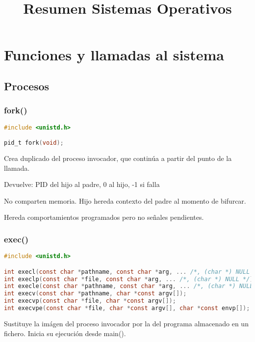 \documentclass[a4paper,10pt]{article}
\title{Resumen Sistemas Operativos}
\date{}
\author{}
\begin{document}
    \maketitle
    \newpage
    \tableofcontents
    \newpage

    \section{Funciones y llamadas al sistema}
        \subsection{Procesos}
            \subsubsection{fork()}

            \begin{lstlisting}[language=c]
#include <unistd.h>

pid_t fork(void);
            \end{lstlisting}

            Crea duplicado del proceso invocador, que continúa a partir del punto de la llamada.

            Devuelve: PID del hijo al padre, 0 al hijo, -1 si falla

            No comparten memoria. Hijo hereda contexto del padre al momento de bifurcar.
        
            Hereda comportamientos programados pero no señales pendientes.

            \subsubsection{exec()}
            \begin{lstlisting}[language=c]
#include <unistd.h>

int execl(const char *pathname, const char *arg, ... /*, (char *) NULL */);
int execlp(const char *file, const char *arg, ... /*, (char *) NULL */);
int execle(const char *pathname, const char *arg, ... /*, (char *) NULL, char *const envp[] */);
int execv(const char *pathname, char *const argv[]);
int execvp(const char *file, char *const argv[]);
int execvpe(const char *file, char *const argv[], char *const envp[]);
            \end{lstlisting}

            Sustituye la imágen del proceso invocador por la del programa almacenado en un fichero. Inicia su ejecución desde main().
            
\end{document}
